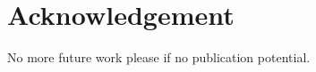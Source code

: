 \section*{Acknowledgement}
\label{sec:acknowledge}

No more future work please if no publication potential.
